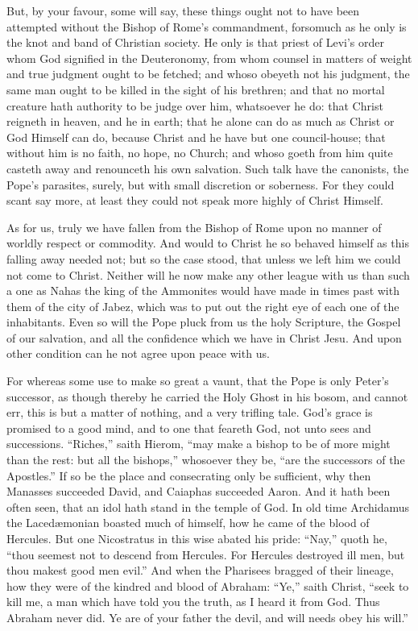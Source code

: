 But, by your favour, some will say, these things ought not to have
been attempted without the Bishop of Rome’s commandment, forsomuch
as he only is the knot and band of Christian society. He only
is that priest of Levi’s order whom God signified
in the Deuteronomy, from whom counsel in matters of weight and true
judgment ought to be fetched; and whoso obeyeth not his judgment, the
same man ought to be killed in the sight of his brethren; and that no
mortal creature hath authority to be judge over him, whatsoever he do:
that Christ reigneth in heaven, and he in earth; that he alone can do
as much as Christ or God Himself can do, because Christ and he have
but one council-house; that without him is no faith, no hope, no Church;
and whoso goeth from him quite casteth away and renounceth his own salvation.
Such talk have the canonists, the Pope’s parasites, surely, but
with small discretion or soberness. For they could scant say more,
at least they could not speak more highly of Christ Himself.

As for us, truly we have fallen from the Bishop of Rome upon no manner
of worldly respect or commodity. And would to Christ he so behaved
himself as this falling away needed not; but so the case stood, that
unless we left him we could not come to Christ. Neither will he
now make any other league with us than such a one as Nahas the king
of the Ammonites would have made in times past with them of the city
of Jabez, which was
to put out the right eye of each one of the inhabitants. Even
so will the Pope pluck from us the holy Scripture, the Gospel of our
salvation, and all the confidence which we have in Christ Jesu.
And upon other condition can he not agree upon peace with us.

For whereas some use to make so great a vaunt, that the Pope is only
Peter’s successor, as though thereby he carried the Holy Ghost
in his bosom, and cannot err, this is but a matter of nothing, and a
very trifling tale. God’s grace is promised to a good mind,
and to one that feareth God, not unto sees and successions. “Riches,”
saith Hierom, “may make a bishop to be of more might than the
rest: but all the bishops,” whosoever they be, “are the
successors of the Apostles.” If so be the place and consecrating
only be sufficient, why then Manasses succeeded David, and Caiaphas
succeeded Aaron. And it hath been often seen, that an idol hath
stand in the temple of God. In old time Archidamus the Lacedæmonian
boasted much of himself, how he came of the blood of Hercules.
But one Nicostratus in this wise abated his pride: “Nay,”
quoth he, “thou seemest not to descend from Hercules. For
Hercules destroyed ill men, but thou makest good men evil.”
And when the Pharisees
bragged of their lineage, how they were of the kindred and blood of
Abraham: “Ye,” saith Christ, “seek to kill me, a man
which have told you the truth, as I heard it from God. Thus Abraham
never did. Ye are of your father the devil, and will needs obey
his will.”

